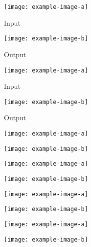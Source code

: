 \begin{figure}
  \begin{subfigure}[t]{.2\textwidth}
    \caption{Input}
    \centering
    \texttt{[image: example-image-a]}
  \end{subfigure}
  \begin{subfigure}[t]{.2\textwidth}
    \caption{Output}
    \centering
    \texttt{[image: example-image-b]}
  \end{subfigure}
  \hfill
  \begin{subfigure}[t]{.2\textwidth}
    \caption{Input}
    \centering
    \texttt{[image: example-image-a]}
  \end{subfigure}
  \begin{subfigure}[t]{.2\textwidth}
    \caption{Output}
    \centering
    \texttt{[image: example-image-b]}
  \end{subfigure}

  \medskip

  \begin{subfigure}[t]{.2\textwidth}
    \centering
    \texttt{[image: example-image-a]}
  \end{subfigure}
  \begin{subfigure}[t]{.2\textwidth}
    \centering
    \texttt{[image: example-image-b]}
  \end{subfigure}
  \hfill
  \begin{subfigure}[t]{.2\textwidth}
    \centering
    \texttt{[image: example-image-a]}
  \end{subfigure}
  \begin{subfigure}[t]{.2\textwidth}
    \centering
    \texttt{[image: example-image-b]}
  \end{subfigure}

  \medskip

  \begin{subfigure}[t]{.2\textwidth}
    \centering
    \texttt{[image: example-image-a]}
  \end{subfigure}
  \begin{subfigure}[t]{.2\textwidth}
    \centering
    \texttt{[image: example-image-b]}
  \end{subfigure}
  \hfill
  \begin{subfigure}[t]{.2\textwidth}
    \centering
    \texttt{[image: example-image-a]}
  \end{subfigure}
  \begin{subfigure}[t]{.2\textwidth}
    \centering
    \texttt{[image: example-image-b]}
  \end{subfigure}


\end{figure}
